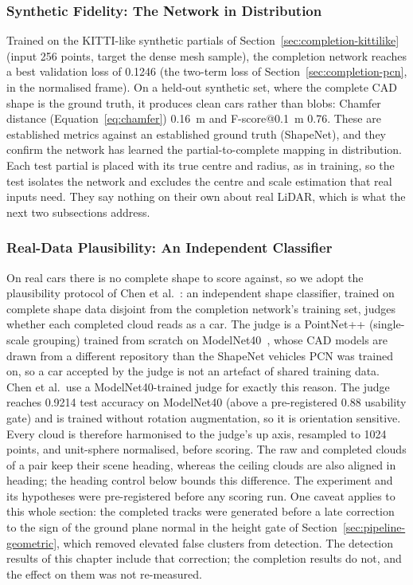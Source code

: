 \subsubsection{Synthetic Fidelity: The Network in Distribution}
\label{sec:results-synthetic}

Trained on the KITTI-like synthetic partials of Section~\ref{sec:completion-kittilike}
(input \num{256} points, target the dense mesh sample), the completion network
reaches a best validation loss of \num{0.1246} (the two-term loss of
Section~\ref{sec:completion-pcn}, in the normalised frame). On
a held-out synthetic set, where the complete CAD shape is the ground truth, it produces
clean cars rather than blobs: Chamfer distance (Equation~\eqref{eq:chamfer}) \SI{0.16}{\meter} and
F-score@\SI{0.1}{\meter} \num{0.76}. These are established metrics against an established
ground truth (ShapeNet), and they confirm the network has learned the partial-to-complete
mapping in distribution. Each test partial is placed with its true centre and radius, as in
training, so the test isolates the network and excludes the centre and scale estimation that
real inputs need. They say nothing on their own about real LiDAR, which is what the
next two subsections address.

\subsubsection{Real-Data Plausibility: An Independent Classifier}
\label{sec:results-plausibility}

On real cars there is no complete shape to score against, so we adopt the plausibility
protocol of Chen et al.~\cite{chen2020unpaired}: an independent shape classifier,
trained on complete shape data disjoint from the completion network's training set, judges
whether each completed cloud reads as a car. The judge is a PointNet++ (single-scale
grouping) trained from scratch on ModelNet40~\cite{wu2015modelnet}, whose CAD models are drawn from a different
repository than the ShapeNet vehicles PCN was trained on, so a car accepted by the judge is not
an artefact of shared training data. Chen et al.\ use a ModelNet40-trained judge for exactly
this reason. The judge reaches \num{0.9214} test accuracy on ModelNet40 (above a
pre-registered \num{0.88} usability gate) and is trained without rotation augmentation, so
it is orientation sensitive. Every cloud is therefore harmonised to the judge's up axis,
resampled to \num{1024} points, and unit-sphere normalised, before scoring. The raw and
completed clouds of a pair keep their scene heading, whereas the ceiling clouds are also
aligned in heading; the heading control below bounds this difference. The experiment and its
hypotheses were pre-registered before any scoring run. One caveat applies to this whole
section: the completed tracks were generated before a late correction to the sign of the ground
plane normal in the height gate of Section~\ref{sec:pipeline-geometric}, which removed elevated
false clusters from detection. The detection results of this chapter include that correction;
the completion results do not, and the effect on them was not re-measured.

